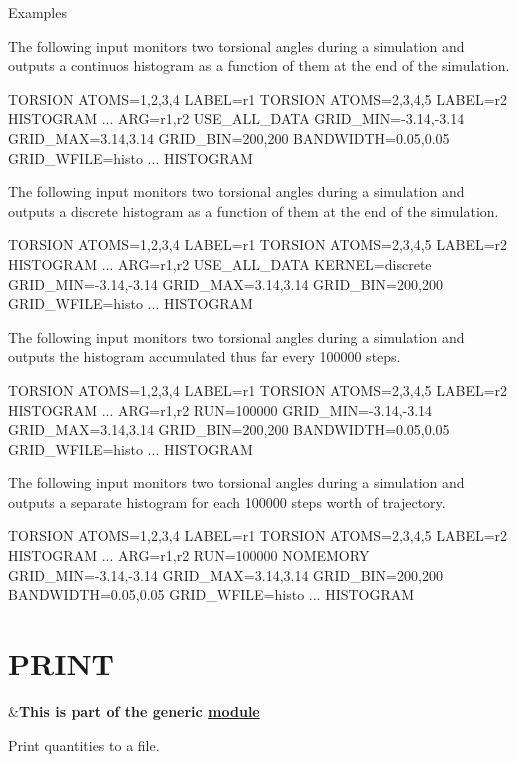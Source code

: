 \begin{DoxyParagraph}{Examples}

\end{DoxyParagraph}
The following input monitors two torsional angles during a simulation and outputs a continuos histogram as a function of them at the end of the simulation. \begin{DoxyVerb}TORSION ATOMS=1,2,3,4 LABEL=r1
TORSION ATOMS=2,3,4,5 LABEL=r2
HISTOGRAM ...
  ARG=r1,r2 
  USE_ALL_DATA 
  GRID_MIN=-3.14,-3.14 
  GRID_MAX=3.14,3.14 
  GRID_BIN=200,200
  BANDWIDTH=0.05,0.05 
  GRID_WFILE=histo
... HISTOGRAM
\end{DoxyVerb}


The following input monitors two torsional angles during a simulation and outputs a discrete histogram as a function of them at the end of the simulation. \begin{DoxyVerb}TORSION ATOMS=1,2,3,4 LABEL=r1
TORSION ATOMS=2,3,4,5 LABEL=r2
HISTOGRAM ...
  ARG=r1,r2 
  USE_ALL_DATA
  KERNEL=discrete 
  GRID_MIN=-3.14,-3.14 
  GRID_MAX=3.14,3.14 
  GRID_BIN=200,200
  GRID_WFILE=histo
... HISTOGRAM
\end{DoxyVerb}


The following input monitors two torsional angles during a simulation and outputs the histogram accumulated thus far every 100000 steps. \begin{DoxyVerb}TORSION ATOMS=1,2,3,4 LABEL=r1
TORSION ATOMS=2,3,4,5 LABEL=r2
HISTOGRAM ...
  ARG=r1,r2 
  RUN=100000
  GRID_MIN=-3.14,-3.14  
  GRID_MAX=3.14,3.14 
  GRID_BIN=200,200
  BANDWIDTH=0.05,0.05 
  GRID_WFILE=histo
... HISTOGRAM
\end{DoxyVerb}


The following input monitors two torsional angles during a simulation and outputs a separate histogram for each 100000 steps worth of trajectory. \begin{DoxyVerb}TORSION ATOMS=1,2,3,4 LABEL=r1
TORSION ATOMS=2,3,4,5 LABEL=r2
HISTOGRAM ...
  ARG=r1,r2 
  RUN=100000 NOMEMORY
  GRID_MIN=-3.14,-3.14  
  GRID_MAX=3.14,3.14 
  GRID_BIN=200,200
  BANDWIDTH=0.05,0.05 
  GRID_WFILE=histo
... HISTOGRAM
\end{DoxyVerb}
 \hypertarget{PRINT}{}\section{P\+R\+I\+N\+T}\label{PRINT}
\begin{TabularC}{2}
\hline
&{\bfseries  This is part of the generic \hyperlink{mymodules}{module }}   \\
\end{TabularC}
Print quantities to a file.

